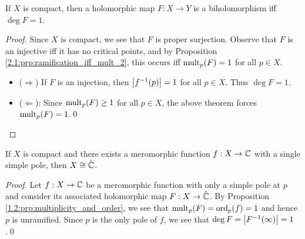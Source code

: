 \documentclass[../Moduli_Spaces_of_Riemann_Surfaces.tex]{subfiles}
\begin{document}
    \begin{corollary}
        If $X$ is compact, then a holomorphic map $F:X\to Y$ is a biholomorphism iff $\deg F=1$.
    \end{corollary}
    \begin{proof}
        Since $X$ is compact, we see that $F$ is proper surjection. Observe that $F$ is an injective iff it has no critical points, and by Proposition \ref{2.1:prp:ramification_iff_mult_2}, this occurs iff $\operatorname{mult}_p\!\left(F\right)=1$ for all $p\in X$.
        \begin{itemize}
            \item ($\Rightarrow$) If $F$ is an injection, then $\left|f^{-1}\!\left(p\right)\right|=1$ for all $p\in X$. Thus $\deg F=1$.
            \item ($\Leftarrow$): Since $\operatorname{mult}_p\!\left(F\right)\geq1$ for all $p\in X$, the above theorem forces $\operatorname{mult}_p\!\left(F\right)=1$.\qed
        \end{itemize}
    \end{proof}
    \begin{corollary}\label{2.1:cor:exists_meromorphic_implies_biholomorphic_Riemann_sphere}
        If $X$ is compact and there exists a meromorphic function $f:X\to\mathbb{C}$ with a single simple pole, then $X\cong\hat{\mathbb{C}}$.
    \end{corollary}
    \begin{proof}
        Let $f:X\to\mathbb{C}$ be a meromorphic function with only a simple pole at $p$ and consider its associated holomorphic map $F:X\to\hat{\mathbb{C}}$. By Proposition \ref{1.2:prp:multiplicity_and_order}, we see that $\operatorname{mult}_p\!\left(F\right)=\operatorname{ord}_p\!\left(f\right)=1$ and hence $p$ is unramified. Since $p$ is the only pole of $f$, we see that $\deg F=\left|F^{-1}\!\left(\infty\right)\right|=1$.\qed
    \end{proof}
\end{document}
